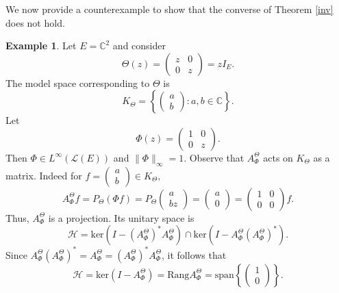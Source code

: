 \documentclass{amsart}
\theoremstyle{definition}
\newtheorem{ex}[thm]{Example}
\newcommand{\hsp}{\mathcal{H}}
\newcommand{\oL }{\mathcal{L}(E) }
\begin{document}
We now provide a counterexample to show that the converse of Theorem \ref{inv} does not hold.
\begin{ex}
Let $E=\mathbb{C}^{2}$ and consider
$$
\Theta(z)=
\begin{pmatrix}
z&0\\
0&z
\end{pmatrix}
=zI_{E}.
$$
The model space corresponding to $\Theta$ is
$$K_{\Theta}=\left\{\begin{pmatrix}
    a\\
    b
\end{pmatrix}:  a, b\in \mathbb{C}\right\}.$$
Let
$$
\Phi(z)=
\begin{pmatrix}
1&0\\
0&z
\end{pmatrix}.
$$
Then $\Phi\in L^{\infty}(\oL)$ and $\|\Phi\|_{\infty}=1$. Observe that $A_{\Phi}^{\Theta}$ acts on $K_{\Theta}$ as a matrix. Indeed for $f=\begin{pmatrix}
    a\\
    b
\end{pmatrix}\in K_{\Theta},$
$$A_{\Phi}^{\Theta}f=P_{\Theta}(\Phi f)=P_{\Theta}
\begin{pmatrix}
a\\
bz
\end{pmatrix}
=\begin{pmatrix}
a\\
0
\end{pmatrix}=\begin{pmatrix}
1&0\\
0&0
\end{pmatrix}f.$$
 Thus, $A_{\Phi}^{\Theta}$ is a projection. Its unitary space is
$$\hsp=\text{ker}(I-(A_{\Phi}^{\Theta})^{*}A_{\Phi}^{\Theta})\cap \text{ker}(I-A_{\Phi}^{\Theta}(A_{\Phi}^{\Theta})^{*}).$$
Since  $A_{\Phi}^{\Theta}(A_{\Phi}^{\Theta})^{*}=A_{\Phi}^{\Theta}=(A_{\Phi}^{\Theta})^{*}A_{\Phi}^{\Theta}$, it follows that %
$$\hsp=\text{ker}(I-A_{\Phi}^{\Theta})=\text{Rang} A_{\Phi}^{\Theta}=\text{span}\left\{\begin{pmatrix}
    1\\
    0
\end{pmatrix}%
\right\}.$$


\end{ex}
\end{document}
